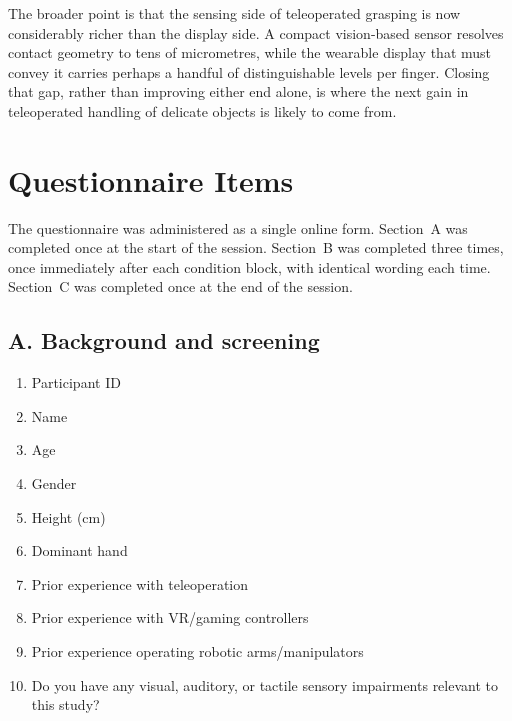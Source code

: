 \documentclass[12pt, a4paper, twoside, openright]{report}
\begin{document}
The broader point is that the sensing side of teleoperated grasping is now
considerably richer than the display side. A compact vision-based sensor
resolves contact geometry to tens of micrometres, while the wearable display
that must convey it carries perhaps a handful of distinguishable levels per
finger. Closing that gap, rather than improving either end alone, is where the
next gain in teleoperated handling of delicate objects is likely to come from.

\cleardoublepage
\begingroup
\raggedright
\printbibliography[heading=bibintoc, title={References}]
\endgroup

\appendix
\cleardoublepage

\chapter{Questionnaire Items}
\label{app:questionnaire}

The questionnaire was administered as a single online form. Section~A was
completed once at the start of the session. Section~B was completed three
times, once immediately after each condition block, with identical wording each
time. Section~C was completed once at the end of the session.

\section*{A. Background and screening}

\begin{enumerate}[label=A\arabic*., widest=A10., leftmargin=*]
    \item Participant ID
    \item Name
    \item Age
    \item Gender
    \item Height (cm)
    \item Dominant hand
    \item Prior experience with teleoperation
    \item Prior experience with VR/gaming controllers
    \item Prior experience operating robotic arms/manipulators
    \item Do you have any visual, auditory, or tactile sensory impairments
          relevant to this study?
\end{enumerate}
\end{document}
